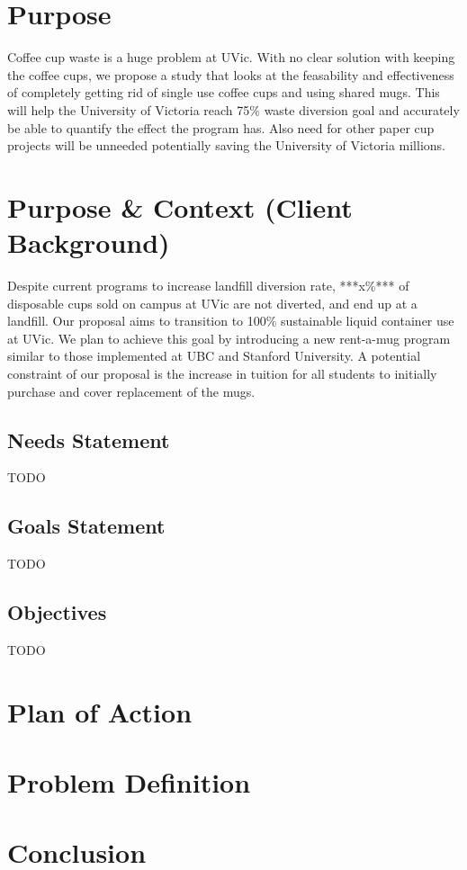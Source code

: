 \documentclass[letterpaper,11pt]{texMemo} %
\begin{document}
\maketitle %


\section* {Purpose}
Coffee cup waste is a huge problem at UVic. With no clear solution with keeping the coffee cups, we
propose a study that looks at the feasability and effectiveness of completely getting rid of single
use coffee cups and using shared mugs. This will help the University of Victoria reach 75\% waste 
diversion goal and accurately be able to quantify the effect the program has. Also need for other 
paper cup projects will be unneeded potentially saving the University of Victoria millions.
\section* {Purpose & Context (Client Background)}
Despite current programs to increase landfill diversion rate, ***x\%*** of
disposable cups sold on campus at UVic are not diverted, and end up at a landfill.
Our proposal aims to transition to 100\% sustainable liquid container use at UVic.
We plan to achieve this goal by introducing a new rent-a-mug program similar to
those implemented at UBC and Stanford University. A potential constraint of
our proposal is the increase in tuition for all students to initially purchase
and cover replacement of the mugs.
\subsection* {Needs Statement}
TODO
\subsection* {Goals Statement}
TODO
\subsection* {Objectives}
TODO

\section* {Plan of Action}
\section {Problem Definition}


\section* {Conclusion}

\end{document}
